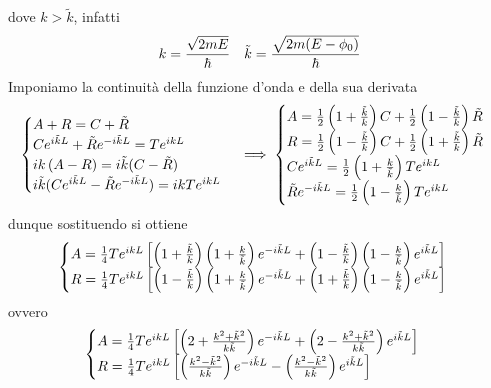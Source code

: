 \documentclass{article}
\begin{document}
dove $k > \tilde{k}$, infatti
\begin{gather}
    k = \frac{\sqrt{2mE}}{\hbar} \quad \tilde{k} = \frac{\sqrt{2m(E - \phi_0)}}{\hbar} \notag
\end{gather}
Imponiamo la continuità della funzione d'onda e della sua derivata
\begin{gather}
    \begin{cases}
        A + R = C + \tilde{R} \\
        Ce^{i\tilde{k}L} + \tilde{R}e^{-i\tilde{k}L} = Te^{ikL} \\
        ik\left( A - R \right) = i\tilde{k}( C - \tilde{R} ) \\
        i\tilde{k}(Ce^{i\tilde{k}L} - \tilde{R}e^{-i\tilde{k}L}) = ikTe^{ikL}
    \end{cases} \implies
    \begin{cases}
        A = \frac{1}{2}\left( 1 + \frac{\tilde{k}}{k} \right)C + \frac{1}{2}\left( 1 - \frac{\tilde{k}}{k} \right)\tilde{R} \\
        R = \frac{1}{2}\left( 1 - \frac{\tilde{k}}{k} \right)C + \frac{1}{2}\left( 1 + \frac{\tilde{k}}{k} \right)\tilde{R} \\
        Ce^{i\tilde{k}L} = \frac{1}{2}\left( 1 + \frac{k}{\tilde{k}} \right)Te^{ikL} \\
        \tilde{R}e^{-i\tilde{k}L} = \frac{1}{2}\left( 1 - \frac{k}{\tilde{k}} \right)Te^{ikL}
    \end{cases} \notag
\end{gather}
dunque sostituendo si ottiene
\begin{gather}
    \begin{cases}
        A = \frac{1}{4}Te^{ikL}\left[ \left( 1 + \frac{\tilde{k}}{k} \right)\left( 1 + \frac{k}{\tilde{k}} \right)e^{-i\tilde{k}L} + \left( 1 - \frac{\tilde{k}}{k} \right)\left( 1 - \frac{k}{\tilde{k}} \right)e^{i\tilde{k}L} \right] \\
        R = \frac{1}{4}Te^{ikL}\left[ \left( 1 - \frac{\tilde{k}}{k} \right)\left( 1 + \frac{k}{\tilde{k}} \right)e^{-i\tilde{k}L} + \left( 1 + \frac{\tilde{k}}{k} \right)\left( 1 - \frac{k}{\tilde{k}} \right)e^{i\tilde{k}L} \right] 
    \end{cases} \notag
\end{gather}
ovvero
\begin{gather}
    \begin{cases}
        A = \frac{1}{4}Te^{ikL}\left[ \left( 2 + \frac{k^2 + \tilde{k}^2}{k\tilde{k}} \right)e^{-i\tilde{k}L} + \left( 2 - \frac{k^2 + \tilde{k}^2}{k\tilde{k}} \right)e^{i\tilde{k}L} \right] \\
        R = \frac{1}{4}Te^{ikL}\left[ \left( \frac{k^2 - \tilde{k}^2}{k\tilde{k}} \right)e^{-i\tilde{k}L} - \left( \frac{k^2 - \tilde{k}^2}{k\tilde{k}} \right)e^{i\tilde{k}L} \right]
    \end{cases} \notag
\end{gather}
\end{document}
